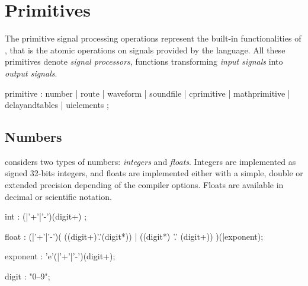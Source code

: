 \section{Primitives}
\label{primitives}
The primitive signal processing operations represent the built-in functionalities of \faust, that is the atomic operations on signals provided by the language. All these primitives denote \emph{signal processors}, functions transforming \emph{input signals} into \emph{output signals}.

  \begin{rail}
  primitive : number
  			| route
  			| waveform
			| soundfile
			| cprimitive
			| mathprimitive
			| delayandtables
			| uielements
			;
  \end{rail}

\subsection{Numbers}

\faust considers two types of numbers: \textit{integers} and \textit{floats}. Integers are implemented as signed 32-bits integers, and floats are implemented either with a simple, double or extended precision depending of the compiler options. Floats are available in decimal or scientific notation. 

  \begin{rail}
  int : (|'+'|'-')(digit+) ;
  \end{rail}

  \begin{rail}
  float : (|'+'|'-')( ((digit+)'.'(digit*)) | ((digit*) '.' (digit+)) )(|exponent);
  \end{rail}

  \begin{rail}
  exponent : 'e'(|'+'|'-')(digit+);
  \end{rail}

  \begin{rail}
  digit : "0--9";
  \end{rail}

\bigskip

